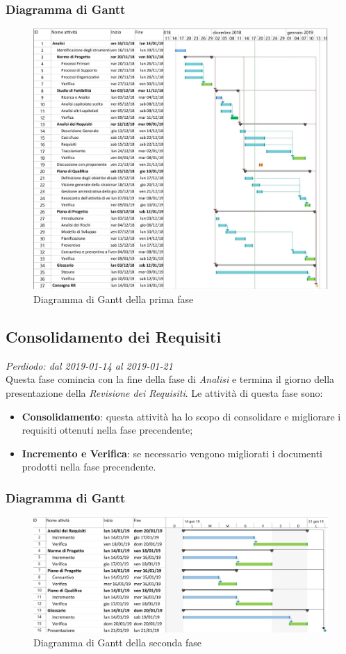 \subsubsection{Diagramma di Gantt}
\begin{figure}[H]
	\includegraphics[scale=0.8]{res/images/gantt_analisi.jpg}
	\caption{Diagramma di Gantt della prima fase}
\end{figure}
\subsection{Consolidamento dei Requisiti}
\textit{Perdiodo: dal 2019-01-14 al 2019-01-21} \\
Questa fase comincia con la fine della fase di \textit{Analisi} e termina il giorno della presentazione della \textit{Revisione dei Requisiti}. Le attività di questa fase sono:
\begin{itemize}
	\item \textbf{Consolidamento}: questa attività ha lo scopo di consolidare e migliorare i requisiti ottenuti nella fase precendente;
	\item \textbf{Incremento e Verifica}: se necessario vengono migliorati i documenti prodotti nella fase precendente.
\end{itemize}
\subsubsection{Diagramma di Gantt}
\begin{figure}[H]
	\includegraphics[scale=0.6]{res/images/gantt_cons.jpg}
	\caption{Diagramma di Gantt della seconda fase}
\end{figure}
